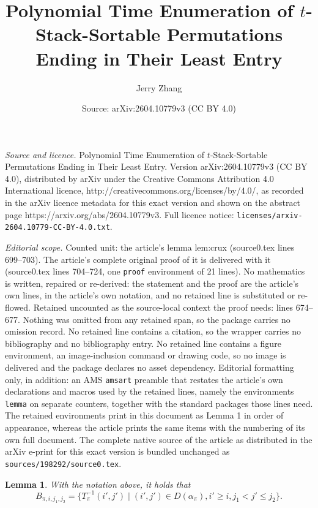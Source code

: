 \documentclass[10pt,a4paper]{amsart}
\title{Polynomial Time Enumeration of $t$-Stack-Sortable Permutations Ending in Their Least Entry}
\author{Jerry Zhang}
\date{Source: arXiv:2604.10779v3 (CC BY 4.0)}
\newtheorem{lemma}{Lemma}
\begin{document}
\maketitle

\noindent\emph{Source and licence.} Polynomial Time Enumeration of $t$-Stack-Sortable Permutations Ending in Their Least Entry. Version arXiv:2604.10779v3 (CC BY 4.0), distributed by arXiv under the Creative Commons Attribution 4.0 International licence, http://creativecommons.org/licenses/by/4.0/, as recorded in the arXiv licence metadata for this exact version and shown on the abstract page https://arxiv.org/abs/2604.10779v3. Full licence notice: \texttt{licenses/arxiv-2604.10779-CC-BY-4.0.txt}.\par\smallskip

\noindent\textit{Editorial scope.} Counted unit: the article's lemma lem:crux (source0.tex lines 699--703). The article's complete original proof of it is delivered with it (source0.tex lines 704--724, one \texttt{proof} environment of 21 lines). No mathematics is written, repaired or re-derived: the statement and the proof are the article's own lines, in the article's own notation, and no retained line is substituted or re-flowed.  Retained uncounted as the source-local context the proof needs: lines 674--677.  Nothing was omitted from any retained span, so the package carries no omission record.  No retained line contains a citation, so the wrapper carries no bibliography and no bibliography entry.  No retained line contains a figure environment, an image-inclusion command or drawing code, so no image is delivered and the package declares no asset dependency.  Editorial formatting only, in addition: an AMS \texttt{amsart} preamble that restates the article's own declarations and macros used by the retained lines, namely the environments \texttt{lemma} on separate counters, together with the standard packages those lines need.  The retained environments print in this document as Lemma 1 in order of appearance, whereas the article prints the same items with the numbering of its own full document.  The complete native source of the article as distributed in the arXiv e-print for this exact version is bundled unchanged as \texttt{sources/198292/source0.tex}.
\begin{lemma}\label{lem:b_alt_expression}
With the notation above, it holds that
\[B_{\pi,i,j_1,j_2}=\{T_{\pi}^{-1}(i',j')\mid (i',j')\in D(\alpha_\pi),i'\ge i, j_1<j'\le j_2\}.\]
\end{lemma}
\end{document}
